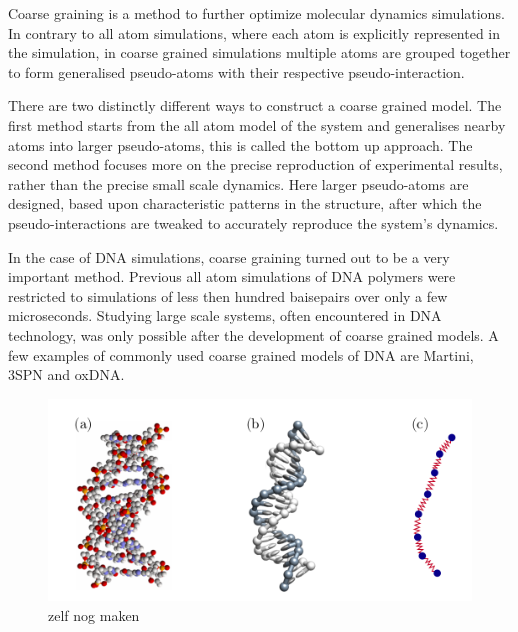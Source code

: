 Coarse graining is a method to further optimize molecular dynamics simulations.
In contrary to all atom simulations, where each atom is explicitly represented in the
simulation, in coarse grained simulations multiple atoms are grouped together to form
generalised pseudo-atoms with their respective pseudo-interaction.

There are two distinctly different ways to construct a coarse grained model. The first
method starts from the all atom model of the system and generalises nearby atoms into
larger pseudo-atoms, this is called the bottom up approach. The second method focuses
more on the precise reproduction of experimental results, rather than
the precise small scale dynamics. Here larger pseudo-atoms are designed, based upon
characteristic patterns in the structure, after which the pseudo-interactions are tweaked
to accurately reproduce the system's dynamics.

In the case of DNA simulations, coarse graining turned out to be a very important method.
Previous all atom simulations of DNA polymers were restricted to simulations of less then
hundred baisepairs over only a few microseconds. Studying large scale systems, often
encountered in DNA technology, was only possible after the development of coarse grained
models. A few examples of commonly used coarse grained models of DNA are Martini, 3SPN
and oxDNA.

\begin{figure}[htpb]
    \centering
    \includegraphics[width=0.6\linewidth]{Figures/CoarseGrained.png}
    \caption{zelf nog maken}%
    \label{fig:Figures/CoarseGrained}
\end{figure}
